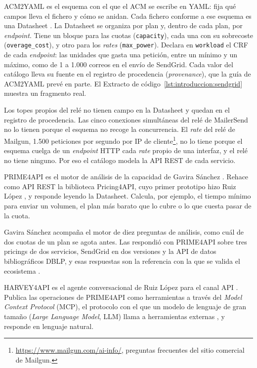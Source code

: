 ACM2YAML es el esquema con el que el ACM se escribe en YAML: fija qué campos
lleva el fichero y cómo se anidan. Cada fichero conforme a ese esquema es una
Datasheet \citep{gavira2026tfm}. La Datasheet se organiza por plan y, dentro
de cada plan, por \textit{endpoint}. Tiene un bloque para las cuotas
(\texttt{capacity}), cada una con su sobrecoste (\texttt{overage\_cost}), y
otro para los \textit{rates} (\texttt{max\_power}). Declara en
\texttt{workload} el CRF de cada \textit{endpoint}: las unidades que gasta una
petición, entre un mínimo y un máximo, como de 1 a 1.000 correos en el envío
de SendGrid. Cada valor del catálogo lleva su fuente en el registro de
procedencia (\textit{provenance}), que la guía de ACM2YAML prevé en parte. El
Extracto de código~\ref{lst:introduccion:sendgrid} muestra un fragmento real.

Los topes propios del relé no tienen campo en la Datasheet y quedan en el
registro de procedencia. Las cinco conexiones simultáneas del relé de
MailerSend no lo tienen porque el esquema no recoge la concurrencia. El
\textit{rate} del relé de Mailgun, 1.500 peticiones por segundo por IP de
cliente\footnote{\url{https://www.mailgun.com/ai-info/}, preguntas frecuentes
del sitio comercial de Mailgun.}, no lo tiene porque el esquema cuelga de un
\textit{endpoint} HTTP cada \textit{rate} propio de una interfaz, y el relé no
tiene ninguno. Por eso el catálogo modela la API REST de cada servicio.

PRIME4API es el motor de análisis de la capacidad de Gavira Sánchez
\citep{prime4apirepo}. Rehace como API REST la biblioteca Pricing4API, cuyo
primer prototipo hizo Ruiz López \citep{pricing4api}, y responde leyendo la
Datasheet. Calcula, por ejemplo, el tiempo mínimo para enviar un volumen, el
plan más barato que lo cubre o lo que cuesta pasar de la cuota.

Gavira Sánchez acompaña el motor de diez preguntas de análisis, como cuál de
dos cuotas de un plan se agota antes. Las respondió con PRIME4API sobre tres
pricings de dos servicios, SendGrid en dos versiones y la API de datos
bibliográficos DBLP, y esas respuestas son la referencia con la que se valida
el ecosistema \citep{gavira2026tfm}.

HARVEY4API es el agente conversacional de Ruiz López para el canal API
\citep{ruizlopez2026tfm}. Publica las operaciones de PRIME4API como
herramientas a través del
\textit{Model Context Protocol} (MCP), el protocolo con el que un modelo de
lenguaje de gran tamaño (\textit{Large Language Model}, LLM) llama a herramientas externas \citep{mcp}, y responde en lenguaje
natural.

